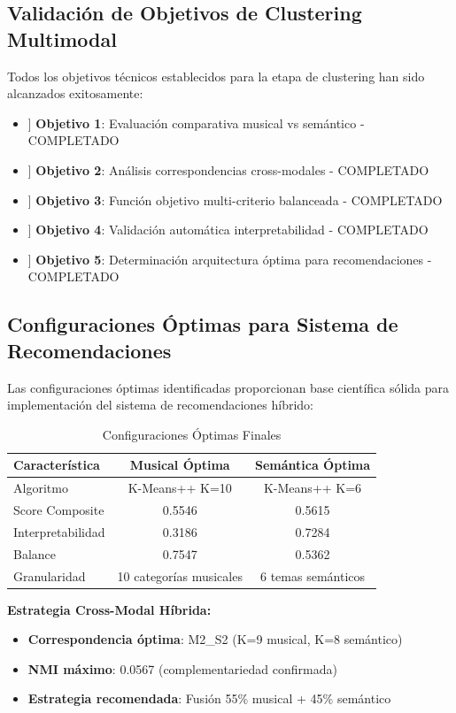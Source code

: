 \documentclass[12pt,a4paper]{report}
\begin{document}
\subsection{Validación de Objetivos de Clustering Multimodal}

Todos los objetivos técnicos establecidos para la etapa de clustering han sido alcanzados exitosamente:

\begin{itemize}
    \item[[SI]] \textbf{Objetivo 1}: Evaluación comparativa musical vs semántico - COMPLETADO
    \item[[SI]] \textbf{Objetivo 2}: Análisis correspondencias cross-modales - COMPLETADO
    \item[[SI]] \textbf{Objetivo 3}: Función objetivo multi-criterio balanceada - COMPLETADO
    \item[[SI]] \textbf{Objetivo 4}: Validación automática interpretabilidad - COMPLETADO
    \item[[SI]] \textbf{Objetivo 5}: Determinación arquitectura óptima para recomendaciones - COMPLETADO
\end{itemize}

\subsection{Configuraciones Óptimas para Sistema de Recomendaciones}

Las configuraciones óptimas identificadas proporcionan base científica sólida para implementación del sistema de recomendaciones híbrido:

\begin{table}[H]
\centering
\caption{Configuraciones Óptimas Finales}
\begin{tabular}{|l|c|c|}
\hline
\textbf{Característica} & \textbf{Musical Óptima} & \textbf{Semántica Óptima} \\
\hline
Algoritmo & K-Means++ K=10 & K-Means++ K=6 \\
\hline
Score Composite & 0.5546 & 0.5615 \\
\hline
Interpretabilidad & 0.3186 & 0.7284 \\
\hline
Balance & 0.7547 & 0.5362 \\
\hline
Granularidad & 10 categorías musicales & 6 temas semánticos \\
\hline
\end{tabular}
\end{table}

\textbf{Estrategia Cross-Modal Híbrida:}
\begin{itemize}
    \item \textbf{Correspondencia óptima}: M2\_S2 (K=9 musical, K=8 semántico)
    \item \textbf{NMI máximo}: 0.0567 (complementariedad confirmada)
    \item \textbf{Estrategia recomendada}: Fusión 55\% musical + 45\% semántico
\end{itemize}
\end{document}
